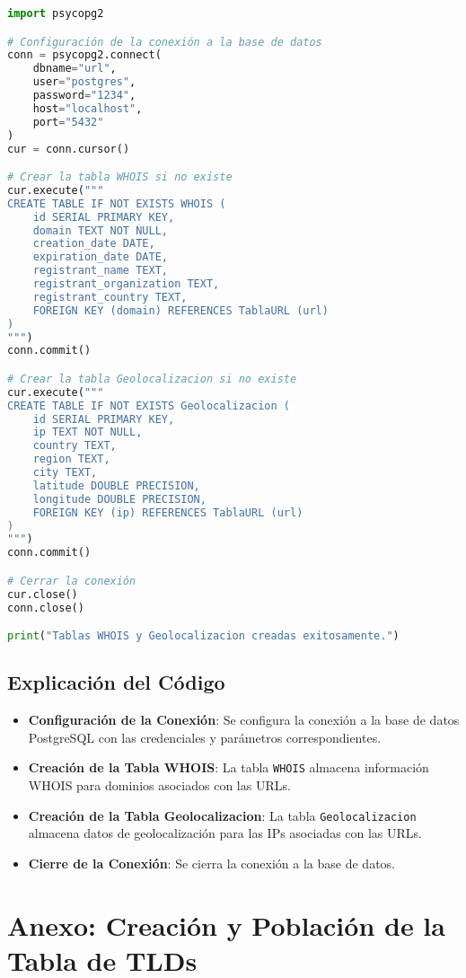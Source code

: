 \begin{lstlisting}[language=Python, caption=Creación de las tablas WHOIS y Geolocalizacion]
import psycopg2

# Configuración de la conexión a la base de datos
conn = psycopg2.connect(
    dbname="url",
    user="postgres",
    password="1234",
    host="localhost",
    port="5432"
)
cur = conn.cursor()

# Crear la tabla WHOIS si no existe
cur.execute("""
CREATE TABLE IF NOT EXISTS WHOIS (
    id SERIAL PRIMARY KEY,
    domain TEXT NOT NULL,
    creation_date DATE,
    expiration_date DATE,
    registrant_name TEXT,
    registrant_organization TEXT,
    registrant_country TEXT,
    FOREIGN KEY (domain) REFERENCES TablaURL (url)
)
""")
conn.commit()

# Crear la tabla Geolocalizacion si no existe
cur.execute("""
CREATE TABLE IF NOT EXISTS Geolocalizacion (
    id SERIAL PRIMARY KEY,
    ip TEXT NOT NULL,
    country TEXT,
    region TEXT,
    city TEXT,
    latitude DOUBLE PRECISION,
    longitude DOUBLE PRECISION,
    FOREIGN KEY (ip) REFERENCES TablaURL (url)
)
""")
conn.commit()

# Cerrar la conexión
cur.close()
conn.close()

print("Tablas WHOIS y Geolocalizacion creadas exitosamente.")
\end{lstlisting}



\section*{Explicación del Código}

\begin{itemize}
    \item \textbf{Configuración de la Conexión}: Se configura la conexión a la base de datos PostgreSQL con las credenciales y parámetros correspondientes.
    \item \textbf{Creación de la Tabla WHOIS}: La tabla \texttt{WHOIS} almacena información WHOIS para dominios asociados con las URLs.
    \item \textbf{Creación de la Tabla Geolocalizacion}: La tabla \texttt{Geolocalizacion} almacena datos de geolocalización para las IPs asociadas con las URLs.
    \item \textbf{Cierre de la Conexión}: Se cierra la conexión a la base de datos.
\end{itemize}


\chapter*{Anexo: Creación y Población de la Tabla de TLDs}

